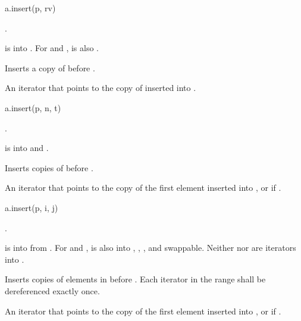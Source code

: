 \begin{itemdecl}
a.insert(p, rv)
\end{itemdecl}

\begin{itemdescr}
\pnum
\result
{}.

\pnum
\expects
{} is  into .
For  and ,
 is also .

\pnum
\effects
Inserts a copy of  before .

\pnum
\returns
An iterator that points to the copy of  inserted into .
\end{itemdescr}

\begin{itemdecl}
a.insert(p, n, t)
\end{itemdecl}

\begin{itemdescr}
\pnum
\result
{}.

\pnum
\expects
{} is  into 
and .

\pnum
\effects
Inserts  copies of  before .

\pnum
\returns
An iterator
that points to the copy of the first element inserted into , or
 if .
\end{itemdescr}

\begin{itemdecl}
a.insert(p, i, j)
\end{itemdecl}

\begin{itemdescr}
\pnum
\result
{}.

\pnum
\expects
{} is  into  from .
For  and ,
 is also
 into ,
,
, and
swappable.
Neither  nor  are iterators into .

\pnum
\effects
Inserts copies of elements in \tcode{[i, j)} before .
Each iterator in the range  shall be dereferenced exactly once.

\pnum
\returns
An iterator
that points to the copy of the first element inserted into , or
 if .
\end{itemdescr}

